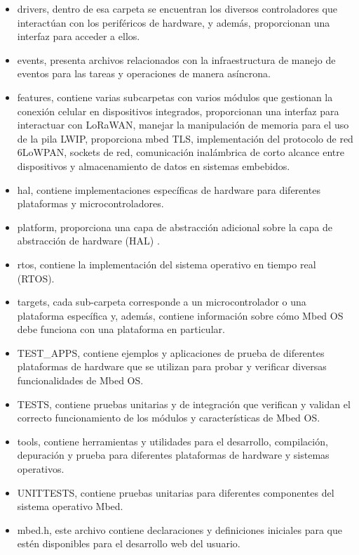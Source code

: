 \begin{itemize}

	\item drivers, dentro de esa carpeta se encuentran los diversos controladores que interactúan con los periféricos de hardware, y además, proporcionan una interfaz para acceder a ellos. 
	
	\item events, presenta archivos relacionados con la infraestructura de manejo de eventos para las tareas y operaciones de manera asíncrona.

	\item features, contiene varias subcarpetas con varios módulos que gestionan la conexión celular en dispositivos integrados, proporcionan una interfaz para interactuar con LoRaWAN, manejar la manipulación de memoria para el uso de la pila LWIP, proporciona mbed TLS, implementación del protocolo de red 6LoWPAN, sockets de red, comunicación inalámbrica de corto alcance entre dispositivos y almacenamiento de datos en sistemas embebidos. 
	
	\item hal, contiene implementaciones específicas de hardware para diferentes plataformas y microcontroladores.  
	
	\item platform, proporciona una capa de abstracción adicional sobre la capa de abstracción de hardware (HAL) .
	
	\item rtos, contiene la implementación del sistema operativo en tiempo real (RTOS).
	
	\item targets, cada sub-carpeta corresponde a un microcontrolador o una plataforma específica y, además, contiene información sobre cómo Mbed OS debe funciona con una plataforma en particular.
	
	\item TEST\_APPS, contiene ejemplos y aplicaciones de prueba de diferentes plataformas de hardware que se utilizan para probar y verificar diversas funcionalidades de Mbed OS.
	
	\item TESTS, contiene pruebas unitarias y de integración que verifican y validan el correcto funcionamiento de los módulos y características de Mbed OS.
	
	\item tools, contiene herramientas y utilidades para el desarrollo, compilación, depuración y prueba para diferentes plataformas de hardware y sistemas operativos.

	\item UNITTESTS, contiene pruebas unitarias para diferentes componentes del sistema operativo Mbed.

	\item mbed.h, este archivo contiene declaraciones y definiciones iniciales para que estén disponibles para el desarrollo web del usuario. 
	
\end{itemize}


